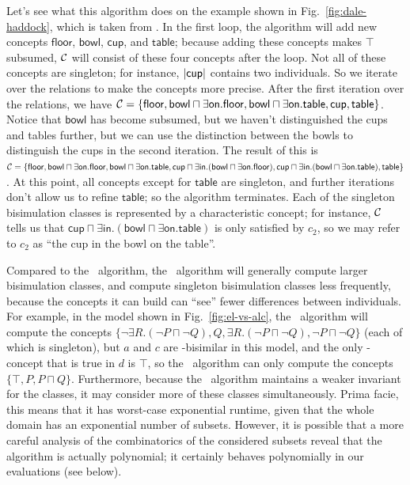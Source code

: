Let's see what this algorithm does on the example shown in
Fig.~\ref{fig:dale-haddock}, which is taken from
.  In the first loop,
the algorithm will add new concepts $\mathsf{floor}$, $\mathsf{bowl}$,
$\mathsf{cup}$, and $\mathsf{table}$; because adding these concepts
makes $\top$ subsumed, $\mathcal{C}$ will consist of these four concepts after
the loop.  Not all of these concepts are singleton; for instance,
$|\mathsf{cup}|$ contains two individuals.  So we iterate over
the relations to make the concepts more precise.  After the first
iteration over the relations, we have $\mathcal{C} = \{ \mathsf{floor},
\mathsf{bowl} \sqcap \exists \mathsf{on}.\mathsf{floor}, \mathsf{bowl}
\sqcap \exists \mathsf{on}.\mathsf{table}, \mathsf{cup},
\mathsf{table} \}$. Notice that $\mathsf{bowl}$ has become subsumed,
but we haven't distinguished the cups and tables further, but we can
use the distinction between the bowls to distinguish the cups in the
second iteration.  The result of this is $\mathcal{C} = \{ \mathsf{floor},
\mathsf{bowl} \sqcap \exists \mathsf{on}.\mathsf{floor}, \mathsf{bowl}
\sqcap \exists \mathsf{on}.\mathsf{table}, \mathsf{cup} \sqcap \exists
\mathsf{in}. (\mathsf{bowl} \sqcap \exists
\mathsf{on}.\mathsf{floor}), \mathsf{cup} \sqcap \exists
\mathsf{in}. (\mathsf{bowl} \sqcap \exists
\mathsf{on}.\mathsf{table}), \mathsf{table} \}$.  At this point, all
concepts except for $\mathsf{table}$ are singleton, and further
iterations don't allow us to refine $\mathsf{table}$; so the algorithm
terminates.  Each of the singleton bisimulation classes is represented
by a characteristic concept; for instance, $\mathcal{C}$ tells us that
$\mathsf{cup} \sqcap \exists \mathsf{in}. (\mathsf{bowl} \sqcap
\exists \mathsf{on}.\mathsf{table})$ is only satisfied by $c_2$, so we
may refer to $c_2$ as ``the cup in the bowl on the table''.

Compared to the \alc\ algorithm, the \el\ algorithm will generally
compute larger bisimulation classes, and compute singleton
bisimulation classes less frequently, because the concepts it can
build can ``see'' fewer differences between individuals.  For example,
in the model shown in Fig.~\ref{fig:el-vs-alc}, the \alc\ algorithm
will compute the concepts $\{\neg \exists R. (\neg P \sqcap \neg Q),
Q, \exists R. (\neg P \sqcap \neg Q), \neg P \sqcap \neg Q\}$ (each of
which is singleton), but $a$ and $c$ are \el-bisimilar in this model,
and the only \el-concept that is true in $d$ is $\top$, so the \el\
algorithm can only compute the concepts $\{\top, P, P \sqcap Q\}$.
Furthermore, because the \el\ algorithm maintains a weaker invariant
for the classes, it may consider more of these classes simultaneously.
Prima facie, this means that it has worst-case exponential runtime,
given that the whole domain has an exponential number of subsets.
However, it is possible that a more careful analysis of the
combinatorics of the considered subsets reveal that the algorithm is
actually polynomial; it certainly behaves polynomially in our
evaluations (see below).


